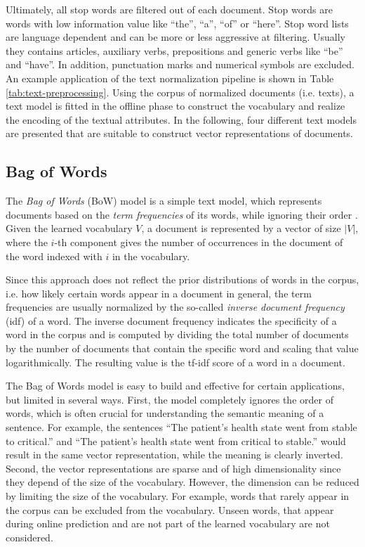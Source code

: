 Ultimately, all stop words are filtered out of each document.
Stop words are words with low information value like  \enquote{the},  \enquote{a},  \enquote{of} or  \enquote{here}.
Stop word lists are language dependent and can be more or less aggressive at filtering.
Usually they contains articles, auxiliary verbs, prepositions and generic verbs like  \enquote{be} and  \enquote{have}.
In addition, punctuation marks and numerical symbols are excluded.
An example application of the text normalization pipeline is shown in Table \ref{tab:text-preprocessing}.
Using the corpus of normalized documents (i.e. texts), a text model is fitted in the offline phase to construct the vocabulary and realize the encoding of the textual attributes.
In the following, four different text models are presented that are suitable to construct vector representations of documents.

\subsection{Bag of Words}\label{sec:bow}

The \textit{Bag of Words} (BoW) model is a simple text model, which represents documents based on the \textit{term frequencies} of its words, while ignoring their order \cite{harris1954distributional}.
Given the learned vocabulary $V$, a document is represented by a vector of size $|V|$, where the $i$-th component gives the number of occurrences in the document of the word indexed with $i$ in the vocabulary.

Since this approach does not reflect the prior distributions of words in the corpus, i.e. how likely certain words appear in a document in general, the term frequencies are usually normalized by the so-called \textit{inverse document frequency} (idf) of a word.
The inverse document frequency indicates the specificity of a word in the corpus and is computed by dividing the total number of documents by the number of documents that contain the specific word and scaling that value logarithmically.
The resulting value is the tf-idf score of a word in a document.

The Bag of Words model is easy to build and effective for certain applications, but limited in several ways.
First, the model completely ignores the order of words, which is often crucial for understanding the semantic meaning of a sentence. For example, the sentences  \enquote{The patient's health state went from stable to critical.} and  \enquote{The patient's health state went from critical to stable.} would result in the same vector representation, while the meaning is clearly inverted.
Second, the vector representations are sparse and of high dimensionality since they depend of the size of the vocabulary.
However, the dimension can be reduced by limiting the size of the vocabulary. For example, words that rarely appear in the corpus can be excluded from the vocabulary.
Unseen words, that appear during online prediction and are not part of the learned vocabulary are not considered.

